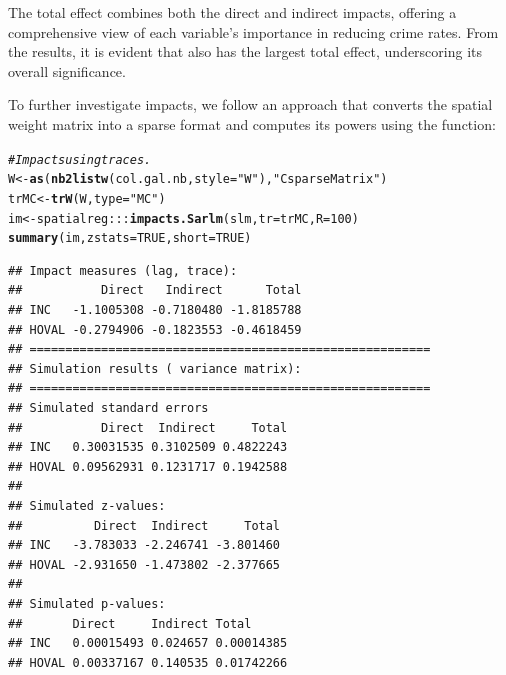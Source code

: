 \documentclass[english,12pt]{book}\usepackage[]{graphicx}\usepackage[]{xcolor}
\makeatletter
\newcommand{\hlnum}[1]{\textcolor[rgb]{0.686,0.059,0.569}{#1}}%
\newcommand{\hlsng}[1]{\textcolor[rgb]{0.192,0.494,0.8}{#1}}%
\newcommand{\hlcom}[1]{\textcolor[rgb]{0.678,0.584,0.686}{\textit{#1}}}%
\newcommand{\hlopt}[1]{\textcolor[rgb]{0,0,0}{#1}}%
\newcommand{\hldef}[1]{\textcolor[rgb]{0.345,0.345,0.345}{#1}}%
\newcommand{\hlkwb}[1]{\textcolor[rgb]{0.69,0.353,0.396}{#1}}%
\newcommand{\hlkwc}[1]{\textcolor[rgb]{0.333,0.667,0.333}{#1}}%
\newcommand{\hlkwd}[1]{\textcolor[rgb]{0.737,0.353,0.396}{\textbf{#1}}}%
\newenvironment{kframe}{%
 \def\at@end@of@kframe{}%
 \ifinner\ifhmode%
  \def\at@end@of@kframe{\end{minipage}}%
  \begin{minipage}{\columnwidth}%
 \fi\fi%
 \def\FrameCommand##1{\hskip\@totalleftmargin \hskip-\fboxsep
 \colorbox{shadecolor}{##1}\hskip-\fboxsep
     \hskip-\linewidth \hskip-\@totalleftmargin \hskip\columnwidth}%
 \MakeFramed {\advance\hsize-\width
   \@totalleftmargin\z@ \linewidth\hsize
   \@setminipage}}%
 {\par\unskip\endMakeFramed%
 \at@end@of@kframe}
\newenvironment{knitrout}{}{} %
\makeatother
\begin{document}
The total effect combines both the direct and indirect impacts, offering a comprehensive view of each variable’s importance in reducing crime rates. From the results, it is evident that  also has the largest total effect, underscoring its overall significance.

To further investigate impacts, we follow an approach that converts the spatial weight matrix into a sparse format and computes its powers using the  function:
\begin{knitrout}
\color{fgcolor}\begin{kframe}
\begin{alltt}
\hlcom{# Impacts using traces. }
\hldef{W} \hlkwb{<-} \hlkwd{as}\hldef{(}\hlkwd{nb2listw}\hldef{(col.gal.nb,} \hlkwc{style} \hldef{=} \hlsng{"W"}\hldef{),} \hlsng{"CsparseMatrix"}\hldef{)}
\hldef{trMC} \hlkwb{<-} \hlkwd{trW}\hldef{(W,} \hlkwc{type} \hldef{=} \hlsng{"MC"}\hldef{)}
\hldef{im} \hlkwb{<-} \hldef{spatialreg}\hlopt{:::}\hlkwd{impacts.Sarlm}\hldef{(slm,} \hlkwc{tr} \hldef{= trMC,} \hlkwc{R} \hldef{=} \hlnum{100}\hldef{)}
\hlkwd{summary}\hldef{(im,} \hlkwc{zstats} \hldef{=}  \hlnum{TRUE}\hldef{,} \hlkwc{short} \hldef{=} \hlnum{TRUE}\hldef{)}
\end{alltt}
\begin{verbatim}
## Impact measures (lag, trace):
##           Direct   Indirect      Total
## INC   -1.1005308 -0.7180480 -1.8185788
## HOVAL -0.2794906 -0.1823553 -0.4618459
## ========================================================
## Simulation results ( variance matrix):
## ========================================================
## Simulated standard errors
##           Direct  Indirect     Total
## INC   0.30031535 0.3102509 0.4822243
## HOVAL 0.09562931 0.1231717 0.1942588
## 
## Simulated z-values:
##          Direct  Indirect     Total
## INC   -3.783033 -2.246741 -3.801460
## HOVAL -2.931650 -1.473802 -2.377665
## 
## Simulated p-values:
##       Direct     Indirect Total     
## INC   0.00015493 0.024657 0.00014385
## HOVAL 0.00337167 0.140535 0.01742266
\end{verbatim}
\end{kframe}
\end{knitrout}
\end{document}
